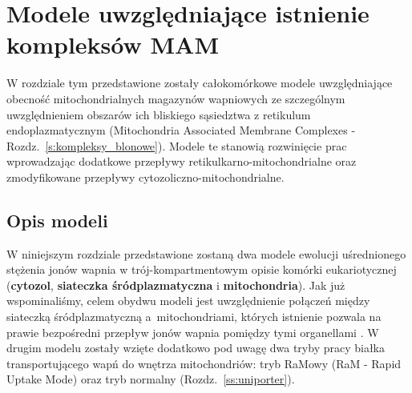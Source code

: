 \chapter{Modele uwzględniające istnienie kompleksów MAM}
 \label{chap:model}

W rozdziale tym przedstawione zostały całokomórkowe modele uwzględniające obecność mitochondrialnych magazynów wapniowych ze szczególnym uwzględnieniem obszarów ich bliskiego sąsiedztwa z retikulum endoplazmatycznym (Mitochondria Associated Membrane Complexes - Rozdz.~\ref{s:kompleksy_blonowe}). Modele te stanowią rozwinięcie prac \cite{Marhl2000,Schuster2002} wprowadzając dodatkowe przepływy retikulkarno-mitochondrialne oraz zmodyfikowane przepływy cytozoliczno-mitochondrialne.

\section{Opis modeli}

W niniejszym rozdziale przedstawione zostaną dwa modele ewolucji uśrednionego stężenia jonów wapnia w trój-kompartmentowym opisie komórki eukariotycznej (\textbf{cytozol}, \textbf{siateczka śródplazmatyczna} i \textbf{mitochondria}). Jak już wspominaliśmy, celem obydwu modeli jest uwzględnienie połączeń między siateczką śródplazmatyczną a~mitochondriami, których istnienie pozwala na prawie bezpośredni przepływ jonów wapnia pomiędzy tymi organellami \cite{Dyzma2012,Szopa2013}. W drugim modelu \cite{Szopa2013} zostały wzięte dodatkowo pod uwagę dwa tryby pracy białka transportującego wapń do wnętrza mitochondriów: tryb RaMowy (RaM - Rapid Uptake Mode) oraz tryb normalny (Rozdz.~\ref{ss:uniporter}).

\medskip

